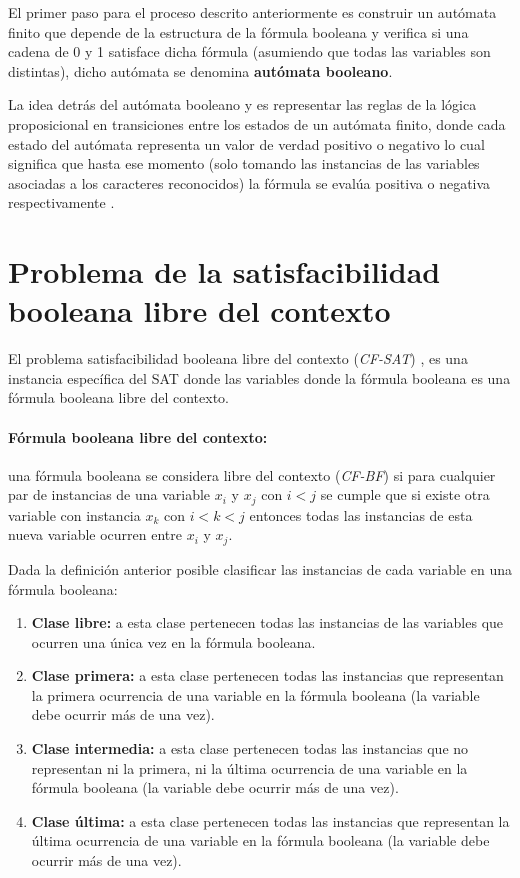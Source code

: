 \documentclass[12pt]{article}
\begin{document}
El primer paso para el proceso descrito anteriormente es construir un autómata finito que depende de la estructura de la fórmula booleana
y verifica si una cadena de 0 y 1 satisface dicha fórmula (asumiendo que todas las variables son distintas), dicho autómata se denomina
\textbf{autómata booleano}.

La idea detrás del autómata booleano y es representar las reglas de la lógica proposicional en transiciones 
entre los estados de un autómata finito, donde cada estado del autómata representa un valor de verdad positivo o 
negativo lo cual significa que hasta ese momento (solo tomando las instancias de las variables asociadas a los 
caracteres reconocidos) la fórmula se evalúa positiva o negativa respectivamente \cite{aCFSAT}.


\section{Problema de la satisfacibilidad booleana libre del contexto}

El problema satisfacibilidad booleana libre del contexto (\textit{CF-SAT}) \cite{aCFSAT}, es una instancia específica
del SAT donde las variables donde la fórmula booleana es una fórmula booleana libre del contexto.

\paragraph{Fórmula booleana libre del contexto:} una fórmula booleana se considera libre del contexto
(\textit{CF-BF}) si para cualquier par de instancias de una variable $x_i$ y $x_j$ con $i<j$ se
cumple que si existe otra variable con instancia $x_k$ con $i<k<j$ entonces todas las instancias de esta nueva
variable ocurren entre $x_i$ y $x_j$.

Dada la definición anterior posible clasificar las instancias de cada variable en una fórmula booleana:

\begin{enumerate}
      \item \textbf{Clase libre:} a esta clase pertenecen todas las instancias de las variables que ocurren
            una única vez en la fórmula booleana.
      \item \textbf{Clase primera:} a esta clase pertenecen todas las instancias que representan la primera
            ocurrencia de una variable en la fórmula booleana (la variable debe ocurrir más de una vez).
      \item \textbf{Clase intermedia:} a esta clase pertenecen todas las instancias que no representan ni la primera, ni la última
            ocurrencia de una variable en la fórmula booleana (la variable debe ocurrir más de una vez).
      \item \textbf{Clase última:} a esta clase pertenecen todas las instancias que representan la última
            ocurrencia de una variable en la fórmula booleana (la variable debe ocurrir más de una vez).
\end{enumerate}
\end{document}
